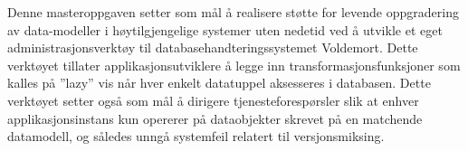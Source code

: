 Denne masteroppgaven setter som mål å realisere støtte for levende oppgradering av data-modeller i høytilgjengelige systemer uten nedetid ved å utvikle et eget administrasjonsverktøy til databasehandteringssystemet Voldemort. Dette verktøyet tillater applikasjonsutviklere å legge inn transformasjonsfunksjoner som kalles på ''lazy'' vis når hver enkelt datatuppel aksesseres i databasen. Dette verktøyet setter også som mål å dirigere tjenesteforespørsler slik at enhver applikasjonsinstans kun opererer på dataobjekter skrevet på en matchende datamodell, og således unngå systemfeil relatert til versjonsmiksing.

\clearpage
